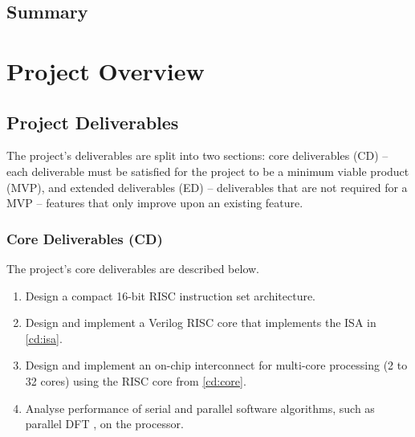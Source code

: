 \documentclass[11pt,a4paper]{report}
\begin{document}
{    \section{Summary}
    
\chapter{Project Overview}
{%
\startcontents[chapters]
}
\section{Project Deliverables}
The project's deliverables are split into two sections: core deliverables (CD) -- each deliverable must be satisfied for the project to be a minimum viable product (MVP), and extended deliverables (ED) -- deliverables that are not required for a MVP -- features that only improve upon an existing feature.

\subsection{Core Deliverables (CD)}
The project's core deliverables are described below.
\begin{enumerate}[leftmargin=2\parindent, label=\bfseries CD\arabic*.]
    \item{Design a compact 16-bit RISC instruction set architecture.}\label{cd:isa}
    \item{Design and implement a Verilog RISC core that implements the ISA in \ref{cd:isa}.}\label{cd:core}
    \item{Design and implement an on-chip interconnect for multi-core processing (2 to 32 cores) using the RISC core from \ref{cd:core}.}\label{cd:interconnect}
    \item{Analyse performance of serial and parallel software algorithms, such as parallel DFT \cite{dft}, on the processor.}\label{cd:software}
\end{enumerate}

}
\end{document}
